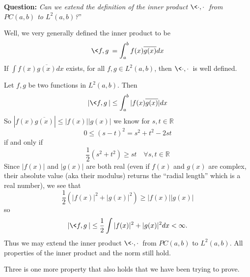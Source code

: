 \textbf{Question:} \emph{Can we extend the definition of the
  inner product $\<\cdot,\cdot\>$ from $PC(a,b)$ to
  $L^{2}(a,b)$?}''

Well, we very generally defined the inner product to be
\begin{equation}
\<f,g\> = \int^{b}_{a}f(x)\overline{g(x)}dx
\end{equation}
If $\int f(x)\overline{g(x)}dx$ exists, for all $f,g\in
L^{2}(a,b)$, then $\<\cdot,\cdot\>$ is well defined.

Let $f,g$ be two functions in $L^{2}(a,b)$. Then
\begin{equation}
|\<f,g\>|\leq \int^{b}_{a}|f(x)\overline{g(x)}|dx
\end{equation}
So $|f(x)\overline{g(x)}|\leq|f(x)||g(x)|$ we know for
$s,t\in\mathbb{R}$
\begin{equation*}
0\leq (s-t)^{2} = s^{2} + t^{2} - 2st
\end{equation*}
if and only if
\begin{equation*}
\frac{1}{2}(s^2+t^2)\geq st \quad\forall s,t\in\mathbb{R}
\end{equation*}
Since $|f(x)|$ and $|g(x)|$ are both real (even if $f(x)$
and $g(x)$ are complex, their absolute value (aka their
modulus) returns the ``radial length'' which is a real
number), we see that
\begin{equation}
\frac{1}{2}\left(|f(x)|^2 + |g(x)|^2\right)\geq|f(x)||g(x)|
\end{equation}
so
\begin{equation}
|\<f,g\>|\leq\frac{1}{2}\int |f(x)|^2 + |g(x)|^2dx<\infty.
\end{equation}
Thus we may extend the inner product $\<\cdot,\cdot\>$ from
$PC(a,b)$ to $L^{2}(a,b)$. All properties of the inner
product and the norm still hold.

Three is one more property that also holds that we have been
trying to prove.


